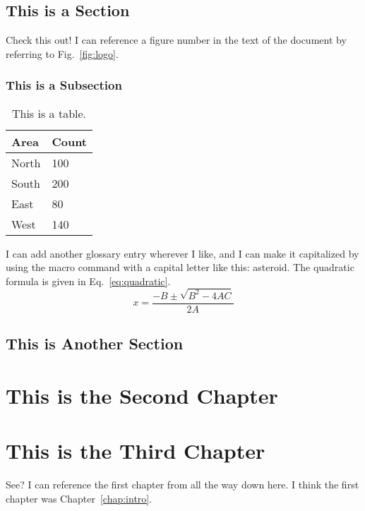 \documentclass[12pt]{cwru_thesis}
\begin{document}
\section{This is a Section} \label{sec:exsection}
\lipsum[1-2]

Check this out! I can reference a figure number in the text of the document by referring to Fig.~\ref{fig:logo}.

\subsection{This is a Subsection} \label{subsec:exsubsec}

\begin{table}[hbt!]
\centering
\begin{tabular}{ll}
\hline
Area & Count\\
\hline
North & 100\\
South & 200\\
East & 80\\
West & 140\\
\hline
\end{tabular}
\caption{This is a table. \label{tab:sample}}
\end{table}

\lipsum[3] 

I can add another glossary entry wherever I like, and I can make it capitalized by using the macro command with a capital letter like this: \Gls{asteroid}. The quadratic formula is given in Eq.~\eqref{eq:quadratic}.
\begin{equation}
    x=\frac{-B \pm \sqrt{B^2 - 4AC}}{2A}
    \label{eq:quadratic}
\end{equation}

\lipsum[4-5] 

\section{This is Another Section}
\lipsum[6-7] 

\chapter{This is the Second Chapter}
\lipsum[8-9]


\chapter{This is the Third Chapter}
See? I can reference the first chapter from all the way down here. I think the first chapter was Chapter~\ref{chap:intro}.
\end{document}
